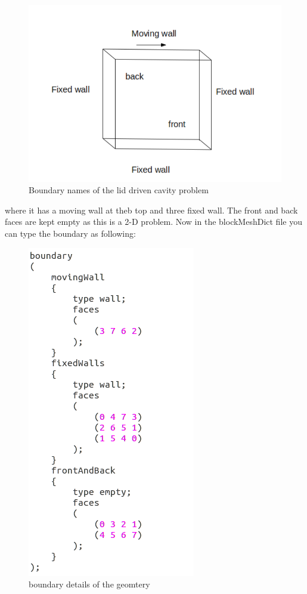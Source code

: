 \documentclass[a4paper,12pt]{report}
\begin{document}
\begin{figure}[ht]  
\begin{center}  
\includegraphics[scale=0.45]{boundary.png}
\caption{Boundary names of the lid driven cavity problem}
\label{boundary1}
\end{center}  
\end{figure}

\flushleft where it has a  moving wall at theb top and three fixed wall. The front and back faces are kept empty as this is a 2-D problem. Now in the blockMeshDict file you can type the boundary as following$:$

\begin{figure}[ht]  
\begin{center}  
\includegraphics[scale=0.66]{boundary_name.png}
\caption{boundary details of the geomtery}
\label{boundary_name}
\end{center}  
\end{figure}
\end{document}
